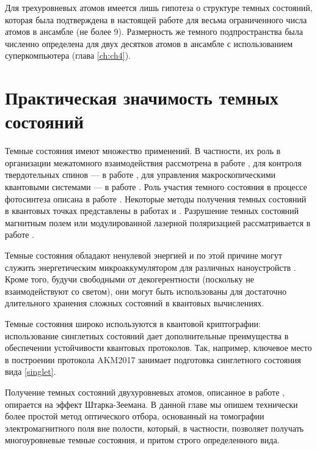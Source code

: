Для трехуровневых атомов имеется лишь гипотеза о структуре темных состоя­ний, которая была подтверждена в настоящей работе для весьма ограниченного числа атомов в ансамбле (не более 9). Размерность же темного подпространства была численно определена для двух десятков атомов в ансамбле с использованием суперкомпьютера (глава \ref{ch:ch4}).

\section{Практическая значимость темных состояний}\label{subsec:ch3/sect2}
Темные состояния имеют множество применений. В частности, их роль в организации межатомного взаимодействия рассмотрена в работе \cite{dark_states_properties_andre}, для контроля твердотельных спинов --- в работе \cite{dark_states_properties_hansom}, для управления макроскопическими квантовыми системами --- в работе \cite{dark_states_properties_bose_einstein}. Роль участия темного состояния в процессе фотосинтеза описана в работе \cite{dark_states_properties_photosynthesis}. Некоторые методы получения темных состояний в квантовых точках представлены в работах \cite{dark_states_properties_poltl} и \cite{dark_states_properties_tanamoto}. Разрушение темных состояний магнитным полем или модулированной лазерной поляризацией рассматривается в работе \cite{dark_states_properties_destabilization}.

Темные состояния обладают ненулевой энергией и по этой причине могут служить энергетическим микроаккумулятором для различных наноустройств \cite{dark_states_quantum_memory}. Кроме того, будучи свободными от декогерентности (поскольку не взаимодействуют со светом), они могут быть использованы для достаточно длительного хранения сложных состояний в квантовых вычислениях.

Темные состояния широко используются в квантовой криптографии: использование синглетных состояний дает дополнительные преимущества в обеспечении устойчивости квантовых протоколов. Так, например, ключевое ме­сто в построении протокола AKM2017 \cite{akm2017} занимает подготовка синглетного состояния вида \eqref{singlet}.

Получение темных состояний двухуровневых атомов, описанное в работе \cite{dark_states_properties_tanamoto}, опирается на эффект Штарка-Зеемана. В данной главе мы опишем технически более простой метод оптического отбора, основанный на томографии электромагнитного поля вне полости, который, в частности, позволяет получать многоуровневые темные состояния, и притом строго определенного вида.

